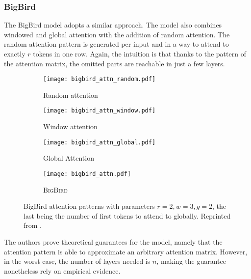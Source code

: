 \subsubsection{BigBird}

The BigBird model \citep{bigbird} adopts a similar approach.
The model also combines windowed and global attention with the addition of random attention.
The random attention pattern is generated per input and in a way to attend to exactly $r$ tokens in one row. Again, the intuition is that thanks to the pattern of the attention matrix, the omitted parts are reachable in just a few layers.

\begin{figure}[!h]
        \centering
        \begin{subfigure}{.22\textwidth}
                \texttt{[image: bigbird\_attn\_random.pdf]}
                \caption{Random attention}
                \label{fig:rnd_atn}
            \end{subfigure}\hfill
            \begin{subfigure}{.22\textwidth}
                \texttt{[image: bigbird\_attn\_window.pdf]}
                \caption{Window attention}
                \label{fig:wnd:atn}
            \end{subfigure}\hfill
            \begin{subfigure}{.22\textwidth}
                \texttt{[image: bigbird\_attn\_global.pdf]}
                \caption{Global Attention}
                \label{fig:gbl_atn}
            \end{subfigure}\hfill
            \begin{subfigure}{.22\textwidth}
                \texttt{[image: bigbird\_attn.pdf]}
                \caption{\textsc{BigBird}}
                \label{fig:bigb_atn}
            \end{subfigure}
        \caption[BigBird Attention Patterns]{BigBird attention patterns with parameters $r=2, w=3, g=2$, the last being the number of first tokens to attend to globally. Reprinted from \citep{bigbird}.}
        \label{fig:bigbird_attention}
\end{figure}

The authors prove theoretical guarantees for the model, namely that the attention pattern is able to approximate an arbitrary attention matrix.
However, in the worst case, the number of layers needed is $n$, making the guarantee nonetheless rely on empirical evidence.

